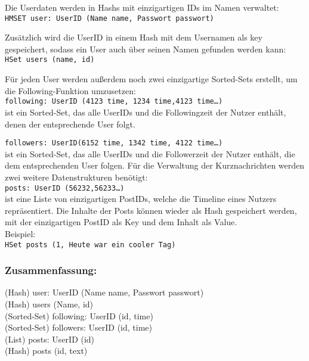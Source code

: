   Die Userdaten werden in Hashs mit einzigartigen IDs im Namen verwaltet: \\
  \texttt{HMSET user: UserID (Name name, Passwort passwort)}

  Zusätzlich wird die UserID in einem Hash mit dem Usernamen als key gespeichert, sodass ein User auch über seinen Namen gefunden werden kann: \\
  \texttt{HSet users (name, id)}

  Für jeden User werden außerdem noch zwei einzigartige Sorted-Sets erstellt, um die Following-Funktion umzusetzen: \\
  \texttt{following: UserID (4123 time, 1234 time,4123 time…)} \\ ist ein Sorted-Set, das alle UserIDs und die Followingzeit der Nutzer enthält, denen der entsprechende User folgt.

  \texttt{followers: UserID(6152 time, 1342 time, 4122 time…)} \\ ist ein Sorted-Set, das alle UserIDs und die Followerzeit der Nutzer enthält, die dem entsprechenden User folgen.
  Für die Verwaltung der Kurznachrichten werden zwei weitere Datenstrukturen benötigt: \\
  \texttt{posts: UserID (56232,56233…)} \\ ist eine Liste von einzigartigen PostIDs, welche die Timeline eines Nutzers repräsentiert.
  Die Inhalte der Posts können wieder als Hash gespeichert werden, mit der einzigartigen PostID als Key und dem Inhalt als Value. \\Beispiel: \\
  \texttt{HSet posts (1, Heute war ein cooler Tag)}

\newpage
  \subsubsection{Zusammenfassung:}
  (Hash) user: UserID (Name name, Passwort passwort) \\
  (Hash) users (Name, id) \\
  (Sorted-Set) following: UserID (id, time) \\
  (Sorted-Set) followers: UserID (id, time) \\
  (List) posts: UserID (id) \\
  (Hash) posts (id, text)
